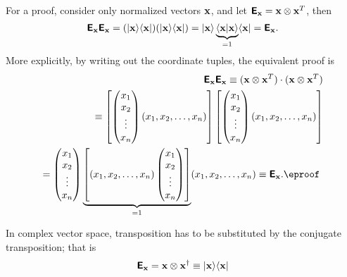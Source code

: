 {\color{OliveGreen}
\bproof
For a proof, consider only normalized vectors ${\bf x}$, and
let $\textsf{\textbf{E}}_{\bf x} = {\bf x}\otimes {\bf x}^T $,
then
$$
\textsf{\textbf{E}}_{\bf x}\textsf{\textbf{E}}_{\bf x}
=
(\vert{\bf x}\rangle \langle {\bf x}\vert)
(\vert{\bf x}\rangle \langle {\bf x}\vert)
=
\vert{\bf x}\rangle \underbrace{\langle {\bf x}\vert {\bf x}\rangle}_{=1} \langle {\bf x}\vert
=  \textsf{\textbf{E}}_{\bf x}.
$$
More explicitly, by writing out the coordinate tuples, the equivalent proof is
\begin{equation}
\begin{split}
\textsf{\textbf{E}}_{\bf x}\textsf{\textbf{E}}_{\bf x}
\equiv ({\bf x}\otimes {\bf x}^T ) \cdot ({\bf x}\otimes {\bf x}^T )
\\
\equiv
\left[
\begin{pmatrix}
x_1\\
x_2\\
\vdots \\
x_n
\end{pmatrix}
(x_1,x_2,\ldots ,x_n)
\right]
\left[
\begin{pmatrix}
x_1\\
x_2\\
\vdots \\
x_n
\end{pmatrix}
(x_1,x_2,\ldots ,x_n)
 \right]
\\
=
\begin{pmatrix}
x_1\\
x_2\\
\vdots \\
x_n
\end{pmatrix}
\underbrace{\left[ (x_1,x_2,\ldots ,x_n)
\begin{pmatrix}
x_1\\
x_2\\
\vdots \\
x_n
\end{pmatrix}
\right]}_{=1}
(x_1,x_2,\ldots ,x_n)
\equiv\textsf{\textbf{E}}_{\bf x}. \textrm{\eproof }
\end{split}
\end{equation}
}

In complex vector space, transposition has to be substituted by the conjugate transposition;
that is
\begin{equation}
\begin{split}
\textsf{\textbf{E}}_{\bf x} = {\bf x} \otimes {\bf x}^\dagger \equiv \vert{\bf x}\rangle \langle {\bf x}\vert
\end{split}
\end{equation}

